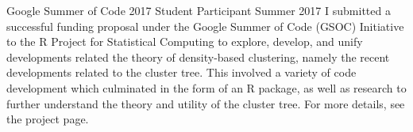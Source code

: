 \documentclass[11pt,a4paper,sans]{moderncv} %
\begin{document}
			 {Google Summer of Code 2017}
			 {Student Participant}
			 {Summer 2017}{}{\vspace{3pt} %
			 I submitted a successful funding proposal under the Google Summer of Code (GSOC) Initiative to the R Project for Statistical Computing to explore, develop, and unify developments related the theory of density-based clustering, namely the recent developments related to the cluster tree. This involved a variety of code development which culminated in the form of an R package, as well as research to further understand the theory and utility of the cluster tree. For more details, see the project page.\footnotemark 
			 } 
\vspace{0.75em}
\end{document}

